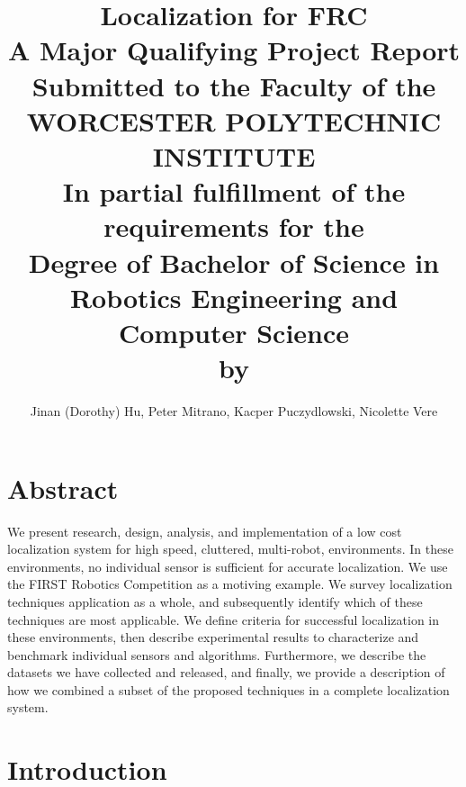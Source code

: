 \documentclass{article}
\begin{document}
\thispagestyle{empty}
\title{
\huge{\textbf{Localization for FRC}} \\
\vspace{1.0cm}
\small{A Major Qualifying Project Report} \\
\vspace{0.7cm}
\small{Submitted to the Faculty of the} \\
\vspace{0.7cm}
\large{WORCESTER POLYTECHNIC INSTITUTE} \\
\vspace{0.7cm}
\small{In partial fulfillment of the requirements for the} \\
\vspace{0.7cm}
Degree of Bachelor of Science in \\
\vspace{0.7cm}
\large{Robotics Engineering and Computer Science} \\
\vspace{0.7cm}
\small{by}}
\author{Jinan (Dorothy) Hu, Peter Mitrano, Kacper Puczydlowski, Nicolette Vere}

\maketitle{}

\newpage


\section*{Abstract}

  We present research, design, analysis, and implementation of a low cost localization system for high speed, cluttered, multi-robot, environments. In these environments, no individual sensor is sufficient for accurate localization. We use the FIRST Robotics Competition as a motiving example. We survey localization techniques application as a whole, and subsequently identify which of these techniques are most applicable. We define criteria for successful localization in these environments, then describe experimental results to characterize and benchmark individual sensors and algorithms. Furthermore, we describe the datasets we have collected and released, and finally, we provide a description of how we combined a subset of the proposed techniques in a complete localization system.




\section{Introduction}
\end{document}
